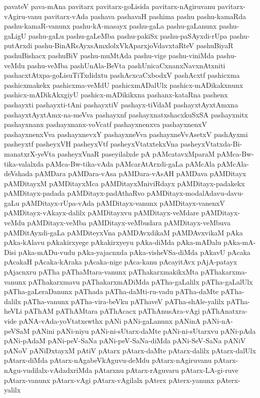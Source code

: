 {pavateV
pava-mAna
pavitarx
pavitarx-goLisida
pavitarx-nAgiruvanu
pavitarx-vAgiru-vanu
pavitarx-vAda
pashava
pashavaH
pashima
pashu
pashu-kamaRda
pashu-kamaR-vanunx
pashu-kA-masayx
pashu-gaLa
pashu-gaLanunx
pashu-gaLigU
pashu-gaLu
pashu-gaLeMba
pashu-pakiSx
pashu-paSAyxdi-rUpa
pashu-putArxdi
pashu-BinARsAyxsAmxlolxVkAparxjoVdavxtaRteV
pashuBiyaR
pashuBishacx
pashuBiV
pashu-muMtAda
pashu-vige
pashu-viniMda
pashu-veMdu
pashu-veMba
pashUnAla-BeVta
pashUnicaCxnanxNavxnAtxniti
pashacxtAtxpa-goLisuTiTxdidxtu
pashAcxcaCxbodxV
pashAcxtf
pashicxma
pashicxmakekx
pashicxma-veMdU
pashicxmADalUlx
pashicx-mADikakxnunx
pashicx-mADikAkxgiyU
pashicx-mADikikxna
pashanx-kataRna
pashenx
pashayxti
pashayxti-tAni
pashayxtiV
pashayx-tiVdaM
pashayxtAyxtAmxna
pashayxtAyxtAmx-na-meVva
pashayxnf
pashayxnatxshacxkuSxSA
pashayxnitx
pashayxnanx
pashayxnanx-voVcatf
pashayxnenxva
pashayxnenxV
pashayxnenxVva
pashayxnevxY
pashayxneVva
pashayxneVvAsetxV
pashAyxmi
pasheyxtf
pasheyxVH
pasheyxVtf
pasheyxVtatxtekxVna
pasheyxVtatxda-Bi-manatxrX-yeVta
pasheyxVnaR
paseyilalxde
pA
pAMcatavxMparaM
pAMca-Bw-tika-valalxda
pAMca-Bw-tika-vAda
pAMcarAtArxdi-gaLa
pAMcAla
pAMcAla-deVshada
pAMDara
pAMDara-vAsa
pAMDara-vAsAH
pAMDava
pAMDitayx
pAMDitayxM
pAMDitayxMca
pAMDitayxMniviRdayx
pAMDitayx-padakekx
pAMDitayx-padada
pAMDitayx-padAthaRvo
pAMDitayx-modalAdavu-davu-gaLu
pAMDitayx-rUpa-vAda
pAMDitayx-vanunx
pAMDitayx-vanenxV
pAMDitayx-vAkayx-dalilx
pAMDitayxvu
pAMDitayx-veMdare
pAMDitayx-veMdu
pAMDitayx-veMba
pAMDitayx-veMbudara
pAMDitayx-veMbuva
pAMDitAyxdi-gaLa
pAMDiteyxVna
pAMDAvxdikaM
pAMDAvxvikaM
pAka
pAka-kAlavu
pAkakirxyege
pAkakirxyeyu
pAka-diMda
pAka-mADalu
pAka-mA-Disi
pAka-mADu-vudu
pAka-yajacnxda
pAka-visheVSa-diMda
pAkavU
pAcaka
pAcakaH
pAcaka-kAraka
pAcaka-nige
pAca-kanu
pAcayitAvx
pAjA-patayx
pAjacnxru
pATha
pAThaMtara-vanunx
pAThakarxmakikxMta
pAThakarxma-vanunx
pAThakarxmavu
pAThakarxmADiMda
pATha-gaLalilx
pATha-gaLalUlx
pATha-gaLeraDanunx
pAThada
pATha-daMti-ru-vadu
pATha-daMte
pATha-dalilx
pATha-vanunx
pATha-vira-beVku
pAThaveV
pATha-shAle-yalilx
pATha-heVLi
pAThAM
pAThAMtara
pAThAcacx
pAThAnusAra-vAgi
pAThAnatxra-vide
pANA-vAda-yoVtatxswthx
pANi
pANi-gaLanunx
pANinA
pANi-nA-peVSaM
pANini
pANi-niyu
pANi-ni-sUtarx-daMte
pANi-ni-sUtarxvu
pANi-pAda
pANi-pAdaM
pANi-peV-SaNa
pANi-peV-SaNa-diMda
pANi-SeV-SaNa
pANiV
pANoV
pANiDxtayxM
pAtiV
pAtarx
pAtarx-daMte
pAtarx-dalilx
pAtarx-dalUlx
pAtarx-diMda
pAtarx-nAgabeVkAguvu-deMdu
pAtarx-nAgiruvanu
pAtarx-nAgu-vudilalx-vAdadxriMda
pAtarxnu
pAtarx-rAguvaru
pAtarx-LA-gi-ruve
pAtarx-vanunx
pAtarx-vAgi
pAtarx-vAgilalx
pAterx
pAterx-yanunx
pAterx-yalilx
}
